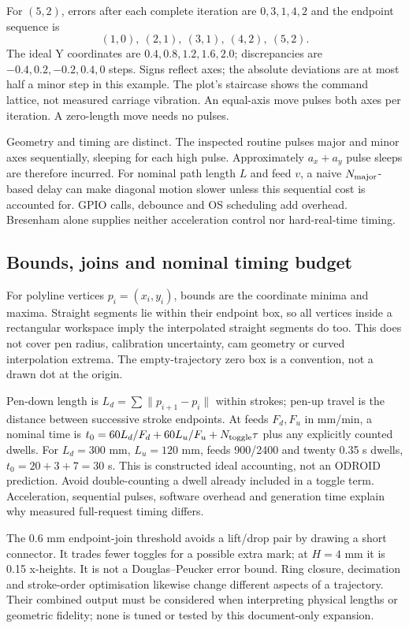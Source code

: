 For $(5,2)$, errors after each complete iteration are $0,3,1,4,2$ and
the endpoint sequence is
\[
(1,0),\ (2,1),\ (3,1),\ (4,2),\ (5,2).
\]
The ideal Y coordinates are $0.4,0.8,1.2,1.6,2.0$; discrepancies are
$-0.4,0.2,-0.2,0.4,0$ steps. Signs reflect axes; the absolute deviations
are at most half a minor step in this example. The plot's staircase shows
the command lattice, not measured carriage vibration. An equal-axis move
pulses both axes per iteration. A zero-length move needs no pulses.

Geometry and timing are distinct. The inspected routine pulses major and
minor axes sequentially, sleeping for each high pulse. Approximately
$a_x+a_y$ pulse sleeps are therefore incurred. For nominal path length
$L$ and feed $v$, a naive $N_{\rm major}$-based delay can make diagonal
motion slower unless this sequential cost is accounted for. GPIO calls,
debounce and OS scheduling add overhead. Bresenham alone supplies neither
acceleration control nor hard-real-time timing.

\subsection{Bounds, joins and nominal timing budget}
For polyline vertices $p_i=(x_i,y_i)$, bounds are the coordinate minima and
maxima. Straight segments lie within their endpoint box, so all vertices
inside a rectangular workspace imply the interpolated straight segments do
too. This does not cover pen radius, calibration uncertainty, cam geometry
or curved interpolation extrema. The empty-trajectory zero box is a
convention, not a drawn dot at the origin.

Pen-down length is $L_d=\sum\|p_{i+1}-p_i\|$ within strokes; pen-up travel
is the distance between successive stroke endpoints. At feeds $F_d,F_u$
in mm/min, a nominal time is
$t_0=60L_d/F_d+60L_u/F_u+N_{\rm toggle}\tau$ plus any explicitly counted
dwells. For $L_d=300$ mm, $L_u=120$ mm, feeds 900/2400 and twenty 0.35 s
dwells, $t_0=20+3+7=30$ s. This is constructed ideal accounting, not an
ODROID prediction. Avoid double-counting a dwell already included in a
toggle term. Acceleration, sequential pulses, software overhead and
generation time explain why measured full-request timing differs.

The 0.6 mm endpoint-join threshold avoids a lift/drop pair by drawing a
short connector. It trades fewer toggles for a possible extra mark; at
$H=4$ mm it is 0.15 x-heights. It is not a Douglas--Peucker error bound.
Ring closure, decimation and stroke-order optimisation likewise change
different aspects of a trajectory. Their combined output must be considered
when interpreting physical lengths or geometric fidelity; none is tuned or
tested by this document-only expansion.
